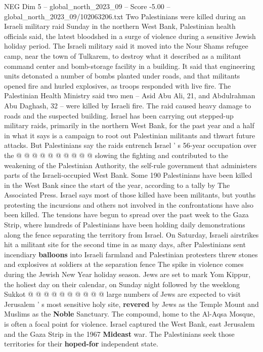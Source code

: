 \begin{textsample}{NEG Dim 5 – global\_north\_2023\_09 – Score -5.00 – global\_north\_2023\_09/102063206.txt}  \label{ex:f5_neg_002}
Two Palestinians were killed during an Israeli military raid Sunday in the northern West Bank, Palestinian health officials said, the latest bloodshed in a surge of violence during a sensitive Jewish holiday period.
The Israeli military said it moved into the Nour Shams refugee camp, near the town of Tulkarem, to destroy what it described as a militant command center and bomb-storage facility in a building.
It said that engineering units detonated a number of bombs planted under roads, and that militants opened fire and hurled explosives, as troops responded with live fire.
The Palestinian Health Ministry said two men -- Asid Abu Ali, 21, and Abdulrahman Abu Daghash, 32 -- were killed by Israeli fire.
The raid caused heavy damage to roads and the suspected building.
Israel has been carrying out stepped-up military raids, primarily in the northern West Bank, for the past year and a half in what it says is a campaign to root out Palestinian militants and thwart future attacks.
But Palestinians say the raids entrench Israel ' s 56-year occupation over the @ @ @ @ @ @ @ @ @ @ slowing the fighting and contributed to the weakening of the Palestinian Authority, the self-rule government that administers parts of the Israeli-occupied West Bank.
Some 190 Palestinians have been killed in the West Bank since the start of the year, according to a tally by The Associated Press.
Israel says most of those killed have been militants, but youths protesting the incursions and others not involved in the confrontations have also been killed.
The tensions have begun to spread over the past week to the Gaza Strip, where hundreds of Palestinians have been holding daily demonstrations along the fence separating the territory from Israel.
On Saturday, Israeli airstrikes hit a militant site for the second time in as many days, after Palestinians sent incendiary \textbf{balloons} into Israeli farmland and Palestinian protesters threw stones and explosives at soldiers at the separation fence The spike in violence comes during the Jewish New Year holiday season.
Jews are set to mark Yom Kippur, the holiest day on their calendar, on Sunday night followed by the weeklong Sukkot @ @ @ @ @ @ @ @ @ @ large numbers of Jews are expected to visit Jerusalem ' s most sensitive holy site, \textbf{revered} by Jews as the Temple Mount and Muslims as the \textbf{Noble} Sanctuary.
The compound, home to the Al-Aqsa Mosque, is often a focal point for violence.
Israel captured the West Bank, east Jerusalem and the Gaza Strip in the 1967 \textbf{Mideast} war.
The Palestinians seek those territories for their \textbf{hoped-for} independent state.

\end{textsample}
